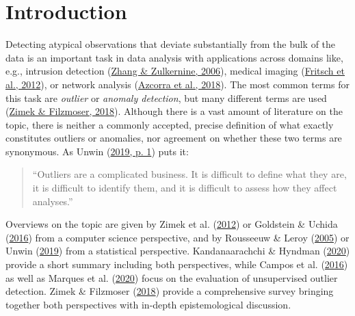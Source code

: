 \documentclass[
  10pt]{article}
\begin{document}
\hypertarget{sec:intro}{%
\section{Introduction}\label{sec:intro}}

Detecting atypical observations that deviate substantially from the bulk of the data is an important task in data analysis with applications across domains like, e.g.,
intrusion detection (\protect\hyperlink{ref-zhang2006anomaly}{Zhang \& Zulkernine, 2006}), medical imaging (\protect\hyperlink{ref-fritsch2012detecting}{Fritsch et al., 2012}), or network analysis (\protect\hyperlink{ref-azcorra2018unsupervised}{Azcorra et al., 2018}).
The most common terms for this task are \emph{outlier} or \emph{anomaly detection}, but
many different terms are used (\protect\hyperlink{ref-zimek2018there}{Zimek \& Filzmoser, 2018}). Although there is a
vast amount of literature on the topic, there is neither a commonly accepted, precise definition of what exactly constitutes outliers or anomalies, nor agreement on whether these two terms are synonymous. As Unwin (\protect\hyperlink{ref-unwin2019multivariate}{2019, p. 1}) puts it:

\begin{quote}
``Outliers are a complicated business. It is difficult to define what they are, it is
difficult to identify them, and it is difficult to assess how they affect analyses.''
\end{quote}

\noindent Overviews on the topic are given by Zimek et al. (\protect\hyperlink{ref-zimek2012survey}{2012}) or Goldstein \& Uchida (\protect\hyperlink{ref-goldstein2016comparative}{2016}) from a computer science perspective, and by Rousseeuw \& Leroy (\protect\hyperlink{ref-rousseeuw2005robust}{2005}) or Unwin (\protect\hyperlink{ref-unwin2019multivariate}{2019}) from a statistical perspective. Kandanaarachchi \& Hyndman (\protect\hyperlink{ref-kandanaarachchi2020dimension}{2020}) provide a short summary including both perspectives, while Campos et al. (\protect\hyperlink{ref-campos2016evaluation}{2016}) as well as Marques et al. (\protect\hyperlink{ref-marques2020internal}{2020}) focus on the evaluation of unsupervised outlier detection. Zimek \& Filzmoser (\protect\hyperlink{ref-zimek2018there}{2018}) provide a comprehensive survey bringing together both perspectives with in-depth epistemological discussion.
\end{document}
